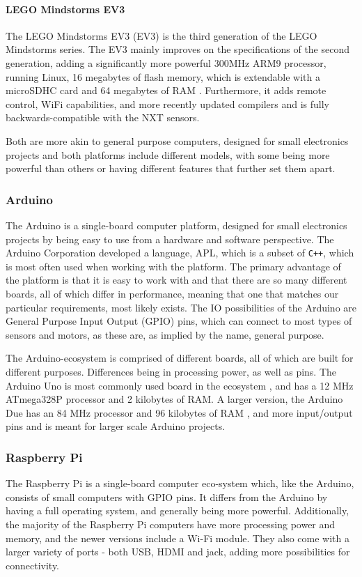\paragraph{LEGO Mindstorms EV3}
The  LEGO Mindstorms EV3 (EV3) is the third generation of the LEGO Mindstorms series.
The EV3 mainly improves on the specifications of the second generation, adding a significantly more powerful 300MHz ARM9 processor, running Linux, 16 megabytes of flash memory, which is extendable with a microSDHC card and 64 megabytes of RAM \cite{ev3userguide}.
Furthermore, it adds remote control, WiFi capabilities, and more recently updated compilers and is fully backwards-compatible with the NXT sensors\cite{ev3nxtcompatability}.

Both are more akin to general purpose computers, designed for small electronics projects and both platforms include different models, with some being more powerful than others or having different features that further set them apart.


\subsubsection{Arduino}
The Arduino is a single-board computer platform, designed for small electronics projects by being easy to use from a hardware and software perspective.
The Arduino Corporation developed a language, APL, which is a subset of \texttt{C++}, which is most often used when working with the platform.
The primary advantage of the platform is that it is easy to work with and that there are so many different boards, all of which differ in performance, meaning that one that matches our particular requirements, most likely exists.
The IO possibilities of the Arduino are General Purpose Input Output (GPIO) pins, which can connect to most types of sensors and motors, as these are, as implied by the name, general purpose.

The Arduino-ecosystem is comprised of different boards, all of which are built for different purposes.
Differences being in processing power, as well as pins.
The Arduino Uno is most commonly used board in the ecosystem \cite{ArduinoUno3}, and has a 12 MHz ATmega328P processor and 2 kilobytes of RAM.
A larger version, the Arduino Due has an 84 MHz processor and 96 kilobytes of RAM \cite{ArduinoDue}, and more input/output pins and is meant for larger scale Arduino projects.

\subsubsection{Raspberry Pi}
The Raspberry Pi is a single-board computer eco-system which, like the Arduino, consists of small computers with GPIO pins.
It differs from the Arduino by having a full operating system, and generally being more powerful.
Additionally, the majority of the Raspberry Pi computers have more processing power and memory, and the newer versions include a Wi-Fi module.
They also come with a larger variety of ports - both USB, HDMI and jack, adding more possibilities for connectivity.

